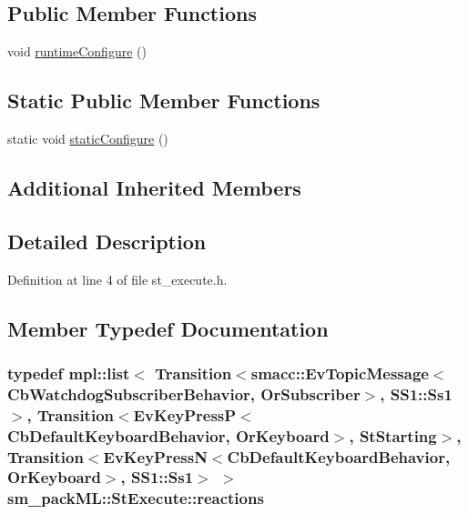 \subsection*{Public Member Functions}
\begin{DoxyCompactItemize}
\item 
void \hyperlink{structsm__packML_1_1StExecute_abf9c1ff5494fcb8aa62aca1c032e986a}{runtime\+Configure} ()
\end{DoxyCompactItemize}
\subsection*{Static Public Member Functions}
\begin{DoxyCompactItemize}
\item 
static void \hyperlink{structsm__packML_1_1StExecute_aa6be62163d90d338b72d08c3837fb97c}{static\+Configure} ()
\end{DoxyCompactItemize}
\subsection*{Additional Inherited Members}


\subsection{Detailed Description}


Definition at line 4 of file st\+\_\+execute.\+h.



\subsection{Member Typedef Documentation}
\subsubsection[{\texorpdfstring{reactions}{reactions}}]{\setlength{\rightskip}{0pt plus 5cm}typedef mpl\+::list$<$ Transition$<${\bf smacc\+::\+Ev\+Topic\+Message}$<${\bf Cb\+Watchdog\+Subscriber\+Behavior}, {\bf Or\+Subscriber}$>$, {\bf S\+S1\+::\+Ss1}$>$, Transition$<$Ev\+Key\+PressP$<$Cb\+Default\+Keyboard\+Behavior, {\bf Or\+Keyboard}$>$, {\bf St\+Starting}$>$, Transition$<$Ev\+Key\+PressN$<$Cb\+Default\+Keyboard\+Behavior, {\bf Or\+Keyboard}$>$, {\bf S\+S1\+::\+Ss1}$>$ $>$ {\bf sm\+\_\+pack\+M\+L\+::\+St\+Execute\+::reactions}}\hypertarget{structsm__packML_1_1StExecute_af23c5d6482c96a3b11339c6b98a1ef8c}{}\label{structsm__packML_1_1StExecute_af23c5d6482c96a3b11339c6b98a1ef8c}


